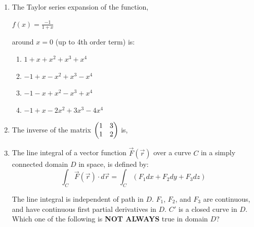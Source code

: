 \documentclass[12pt,a4paper]{article}
\begin{document}
\begin{enumerate}
\item The Taylor series expansion of the function,\hfill{}\begin{center}
		{\Large $f(x) = \frac{-1}{1+x}$}
\end{center}
\noindent
around $x = 0$ (up to 4th order term) is:
\begin{enumerate}
	\item $ 1 + x + x^2 + x^3 + x^4$
	\item $ -1 + x - x^2 + x^3 - x^4$
	\item $ -1 - x + x^2 - x^3 + x^4$
	\item $ -1 + x - 2x^2 + 3x^3 - 4x^4$
\end{enumerate}
\item The inverse of the matrix $\begin{pmatrix} 1 & 3 \\ 1 & 2\end{pmatrix}$ is, \hfill{}\\	
\begin{enumerate}
\end{enumerate}


\item The line integral of a vector function $\vec{F}(\vec{r})$ over a curve $C$ in a simply connected domain $D$ in space, is defined by: \hfill{}
\[
\int_C \vec{F}(\vec{r}) \cdot d\vec{r} = \int_C (F_1 dx + F_2 dy + F_3 dz)
\]

The line integral is independent of path in $D$. $F_1$, $F_2$, and $F_3$ are continuous, and have continuous first partial derivatives in $D$. $C'$ is a closed curve in $D$.\\

\noindent
Which one of the following is \textbf{NOT ALWAYS} true in domain $D$?

\begin{enumerate}
\end{enumerate}


\end{enumerate}
\end{document}
